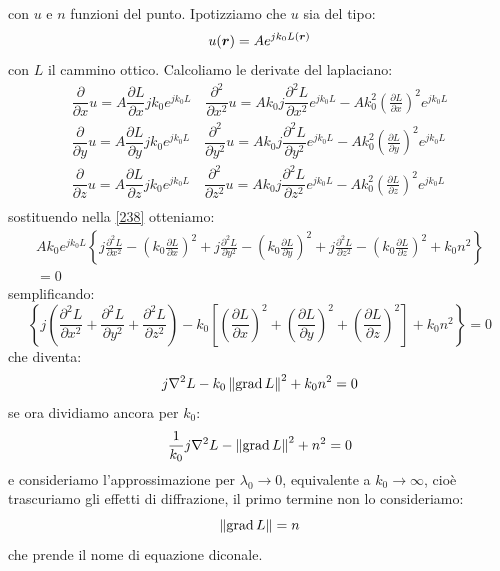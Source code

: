 con $u$ e $n$ funzioni del punto. Ipotizziamo che $u$ sia del tipo:
\begin{equation}
  u(\boldsymbol{r})=Ae^{jk_0 L(\boldsymbol{r})}
\end{equation}
con $L$ il cammino ottico. Calcoliamo le derivate del laplaciano:
\begin{gather*}
  \dfrac{\partial}{\partial x} u = A\dfrac{\partial L}{\partial x}jk_0e^{j k_0 L}\quad\dfrac{\partial^2}{\partial x^2} u =Ak_0j\dfrac{\partial^2 L}{\partial x^2}e^{j k_0 L}-Ak_0^2\left(\frac{\partial L}{\partial x}\right)^2 e^{jk_0 L}\\
  \dfrac{\partial}{\partial y} u = A\dfrac{\partial L}{\partial y}jk_0e^{j k_0 L}\quad\dfrac{\partial^2}{\partial y^2} u =Ak_0j\dfrac{\partial^2 L}{\partial y^2}e^{j k_0 L}-Ak_0^2\left(\frac{\partial L}{\partial y}\right)^2 e^{jk_0 L}\\
  \dfrac{\partial}{\partial z} u = A\dfrac{\partial L}{\partial z}jk_0e^{j k_0 L}\quad\dfrac{\partial^2}{\partial z^2} u =Ak_0j\dfrac{\partial^2 L}{\partial z^2}e^{j k_0 L}-Ak_0^2\left(\frac{\partial L}{\partial z}\right)^2 e^{jk_0 L}\\
\end{gather*}
sostituendo nella \eqref{238} otteniamo:
\begin{multline}
  Ak_0e^{jk_0 L}\left\{j\frac{\partial^2 L}{\partial x^2}-\left(k_0\frac{\partial L}{\partial x}\right)^2+j\frac{\partial^2 L}{\partial y^2}-\left(k_0\frac{\partial L}{\partial y}\right)^2+j\frac{\partial^2 L}{\partial z^2}-\left(k_0\frac{\partial L}{\partial z}\right)^2+k_0n^2\right\}\\=0
\end{multline}
semplificando:
\begin{equation}
  \left\{j\left(\frac{\partial^2 L}{\partial x^2}+\frac{\partial^2 L}{\partial y^2}+\frac{\partial^2 L}{\partial z^2}\right)-k_0\left[\left(\frac{\partial L}{\partial x}\right)^2+\left(\frac{\partial L}{\partial y}\right)^2+\left(\frac{\partial L}{\partial z}\right)^2\right]+k_0n^2\right\}=0
\end{equation}
che diventa:
\begin{equation}
  j\nabla^2 L-k_0\left\lVert\operatorname{grad} L\right\rVert^2+k_0n^2=0
\end{equation}
se ora dividiamo ancora per $k_0$:
\begin{equation}
  \frac{1}{k_0}j\nabla^2 L-\left\lVert\operatorname{grad} L\right\rVert^2+n^2=0
\end{equation}
e consideriamo l'approssimazione per $\lambda_0\to 0$, equivalente a $k_0\to\infty$, cioè trascuriamo gli effetti di diffrazione, il primo termine non lo consideriamo:
\begin{equation}
  \left\lVert\operatorname{grad} L\right\rVert=n
\end{equation}
che prende il nome di equazione diconale.
